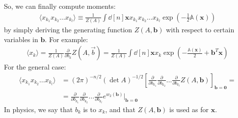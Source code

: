 \documentclass[../template.tex]{subfiles}
\begin{document}
So, we can finally compute moments:   
\begin{align*}
    \langle x_{k_1} x_{k_2} \dots x_{k_l} \rangle \equiv \frac{1}{Z(A)} \int \dd[n]{\bm{x}} x_{k_1} x_{k_2} \dots x_{k_l} \exp\left(-\frac{1}{2} \mathbb{A}(\bm{x}) \right) 
\end{align*}
by simply deriving the generating function $Z(A, \bm{b})$ with respect to certain variables in $\bm{b}$. For example:
\begin{align*}
    \langle x_k \rangle = \frac{1}{Z(A)} \frac{\partial}{\partial b_k} Z(A,\vec{b}) = \frac{1}{Z(A)}  \int \dd[n]{\bm{x}}  x_k \exp\left(-\frac{\mathbb{A}(\bm{x})}{2} + \bm{b}^T \bm{x} \right) 
\end{align*} 
For the general case:
\begin{align*}
    \langle x_{k_1} x_{k_2 }\dots x_{k_l} \rangle &= (2\pi)^{-n/2}(\operatorname{det}A )^{-1/2} \left[\frac{\partial}{\partial b_{k_1 }} \frac{\partial}{\partial b_{k_2 }} \dots \frac{\partial}{\partial b_{k_l}} Z(A,\bm{b})   \right]_{\bm{b}=\bm{0}} =\\
    &= \frac{\partial}{\partial b_{k_1 }} \frac{\partial}{\partial b_{k_2 }} \dots \frac{\partial}{\partial b_{k_l}} e^{w_2(\bm{b})} \Big|_{\bm{b}=\bm{0}}
\end{align*}    
In physics, we say that $b_k$ is  to $x_k$, and that $Z(A,\bm{b})$ is used as  for $\bm{x}$.\\
\end{document}
